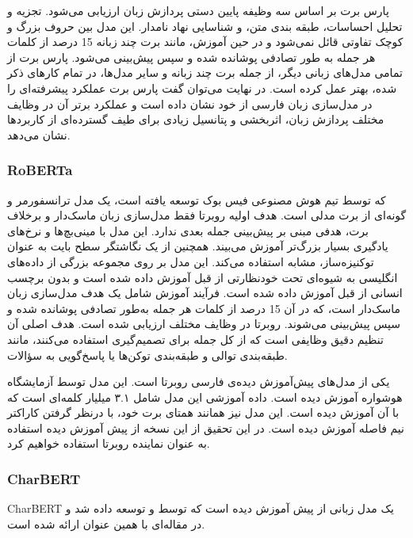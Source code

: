 پارس برت بر اساس سه وظیفه پایین دستی پردازش زبان ارزیابی می‌شود. تجزیه و تحلیل احساسات، طبقه بندی متن، و شناسایی نهاد نامدار. این مدل  بین حروف بزرگ و کوچک تفاوتی قائل نمی‌شود و در حین آموزش، مانند برت چند زبانه 15 درصد از کلمات هر جمله به طور تصادفی پوشانده شده و سپس پیش‌بینی می‌شود.
 پارس برت از تمامی مدل‌های زبانی دیگر، از جمله برت چند زبانه و سایر مدل‌ها، در تمام کارهای ذکر شده، بهتر عمل کرده است. در نهایت می‌توان گفت پارس برت عملکرد پیشرفته‌ای را در مدل‌سازی زبان فارسی از خود نشان داده است و عملکرد برتر آن در وظایف مختلف پردازش زبان، اثربخشی و پتانسیل زیادی برای طیف گسترده‌ای از کاربردها نشان می‌دهد.



\subsubsection{RoBERTa}
\hspace{30pt}
 که توسط تیم هوش مصنوعی فیس بوک توسعه یافته است، یک مدل ترانسفورمر و گونه‌ای از برت مدلی است.\cite{liu2019roberta} هدف اولیه روبرتا فقط مدل‌سازی زبان ماسک‌دار و برخلاف برت، هدفی مبنی بر پیش‌بینی جمله بعدی ندارد. این مدل با مینی‌بچ‌ها و نرخ‌های یادگیری بسیار بزرگ‌تر آموزش می‌بیند. همچنین از یک نگاشتگر سطح بایت به عنوان توکنیزه‌ساز، مشابه  استفاده می‌کند. این مدل بر روی مجموعه بزرگی از داده‌های انگلیسی به شیوه‌ای تحت خودنظارتی از قبل آموزش داده شده است و بدون برچسب انسانی از قبل آموزش داده شده است. فرآیند آموزش شامل یک هدف مدل‌سازی زبان ماسک‌دار  است، که در آن 15 درصد از کلمات هر جمله به‌طور تصادفی پوشانده شده و سپس پیش‌بینی می‌شوند. روبرتا در وظایف مختلف ارزیابی شده است. هدف اصلی آن تنظیم دقیق وظایفی است که از کل جمله برای تصمیم‌گیری استفاده می‌کنند، مانند طبقه‌بندی توالی و طبقه‌بندی توکن‌ها یا پاسخ‌گویی به سؤالات.

یکی از مدل‌های پیش‌آموزش دیده‌ی فارسی روبرتا \cite{roberta-fa-zwnj-base} است. این مدل توسط آزمایشگاه هوشواره آموزش دیده است. داده آموزشی این مدل شامل ۳.۱ میلیار کلمه‌ای است که   با آن آموزش دیده است. این مدل نیز همانند همتای برت خود، با درنظر گرفتن کاراکتر نیم فاصله آموزش دیده است. در این تحقیق از این نسخه از پیش آموزش دیده استفاده به عنوان نماینده روبرتا استفاده خواهیم‌ کرد.

\subsubsection{CharBERT}
\hspace{30pt}
CharBERT یک مدل زبانی از پیش آموزش دیده است که توسط  و  توسعه داده شد و در مقاله‌ای با همین عنوان  ارائه شده است.\cite{Ma_2020}

